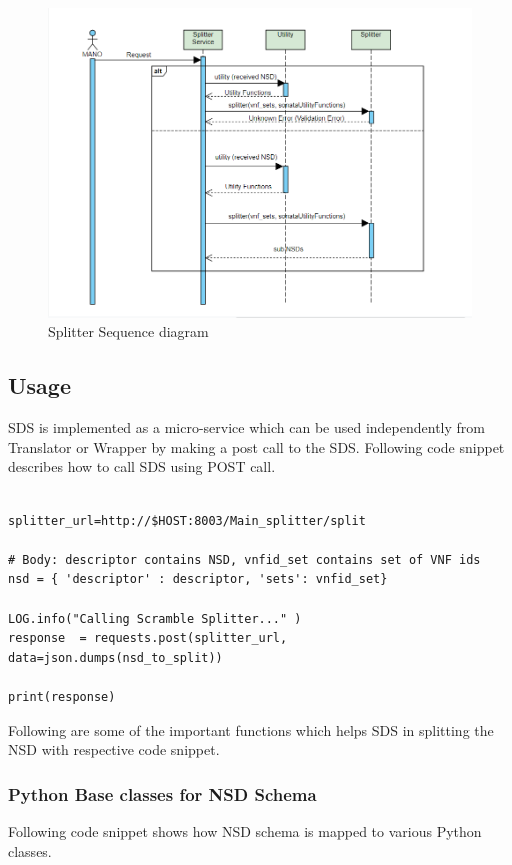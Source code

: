 \begin{figure}
	\centering
	\includegraphics[width=1\linewidth]{../figures/splitter_sequence_diagram}
	\caption{Splitter Sequence diagram}
	\label{fig:splittersequencediagram}
\end{figure}



\subsection{Usage}

SDS is implemented as a micro-service which can be used independently from Translator or Wrapper by making a post call to the SDS. Following code snippet describes how to call SDS using POST call.

\begin{lstlisting}[caption=POST call to SDS, label=lis:postSDS]

splitter_url=http://$HOST:8003/Main_splitter/split

# Body: descriptor contains NSD, vnfid_set contains set of VNF ids
nsd = { 'descriptor' : descriptor, 'sets': vnfid_set}

LOG.info("Calling Scramble Splitter..." )
response  = requests.post(splitter_url,
data=json.dumps(nsd_to_split))

print(response)

\end{lstlisting}

Following are some of the important functions which helps SDS in splitting the NSD with respective code snippet.

\subsubsection{Python Base classes for NSD Schema} Following code snippet shows how NSD schema is mapped to various Python classes.

